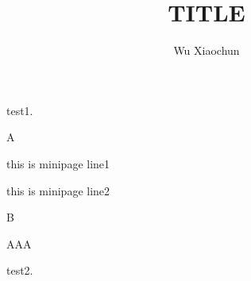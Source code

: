 \documentclass[12pt,a4paper,onecolumn]{article}
\title{TITLE}
\author{Wu Xiaochun}
\date{}
\begin{document}
test1.

A
\begin{minipage}[t]{0.5\textwidth}
this is minipage line1

this is minipage line2
\end{minipage}
B


AAA

test2.
\end{document}
